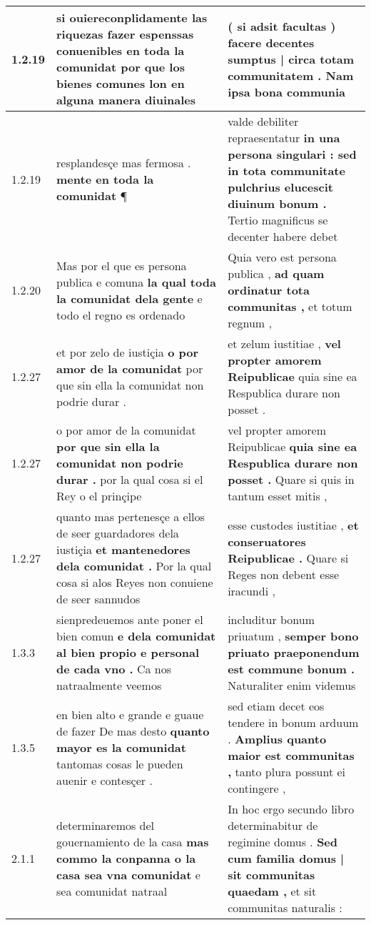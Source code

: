 \begin{tabular}{|p{1cm}|p{6.5cm}|p{6.5cm}|}
1.2.19 & si \textbf{ ouiereconplidamente las riquezas fazer espenssas conuenibles en toda la comunidat } por que los bienes comunes lon en alguna manera diuinales & ( si adsit facultas ) \textbf{ facere decentes sumptus | circa totam communitatem . } Nam ipsa bona communia \\\hline
1.2.19 & resplandesçe mas fermosa . \textbf{ mente en toda la comunidat } ¶ & valde debiliter repraesentatur \textbf{ in una persona singulari : sed in tota communitate pulchrius elucescit diuinum bonum . } Tertio magnificus se decenter habere debet \\\hline
1.2.20 & Mas por el que es persona publica e comuna \textbf{ la qual toda la comunidat dela gente } e todo el regno es ordenado & Quia vero est persona publica , \textbf{ ad quam ordinatur tota communitas , } et totum regnum , \\\hline
1.2.27 & et por zelo de iustiçia \textbf{ o por amor de la comunidat } por que sin ella la comunidat non podrie durar . & et zelum iustitiae , \textbf{ vel propter amorem Reipublicae } quia sine ea Respublica durare non posset . \\\hline
1.2.27 & o por amor de la comunidat \textbf{ por que sin ella la comunidat non podrie durar . } por la qual cosa si el Rey o el prinçipe & vel propter amorem Reipublicae \textbf{ quia sine ea Respublica durare non posset . } Quare si quis in tantum esset mitis , \\\hline
1.2.27 & quanto mas pertenesçe a ellos de seer guardadores dela iustiçia \textbf{ et mantenedores dela comunidat . } Por la qual cosa si alos Reyes non conuiene de seer sannudos & esse custodes iustitiae , \textbf{ et conseruatores Reipublicae . } Quare si Reges non debent esse iracundi , \\\hline
1.3.3 & sienpredeuemos ante poner el bien comun \textbf{ e dela comunidat al bien propio e personal de cada vno . } Ca nos natraalmente veemos & includitur bonum priuatum , \textbf{ semper bono priuato praeponendum est commune bonum . } Naturaliter enim videmus \\\hline
1.3.5 & en bien alto e grande e guaue de fazer De mas desto \textbf{ quanto mayor es la comunidat } tantomas cosas le pueden auenir e contesçer . & sed etiam decet eos tendere in bonum arduum . \textbf{ Amplius quanto maior est communitas , } tanto plura possunt ei contingere , \\\hline
2.1.1 & determinaremos del gouernamiento de la casa \textbf{ mas commo la conpanna o la casa sea vna comunidat } e sea comunidat natraal & In hoc ergo secundo libro determinabitur de regimine domus . \textbf{ Sed cum familia domus | sit communitas quaedam , } et sit communitas naturalis : \\\hline

\end{tabular}
